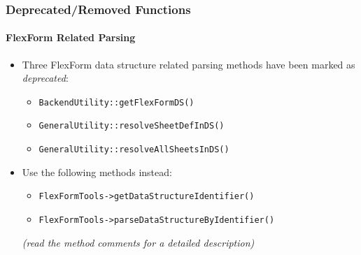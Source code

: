 \begin{frame}[fragile]
	\frametitle{Deprecated/Removed Functions}
	\framesubtitle{FlexForm Related Parsing}

	\begin{itemize}
		\item Three FlexForm data structure related parsing methods have been marked as \textit{deprecated}:

			\begin{itemize}
				\item \texttt{BackendUtility::getFlexFormDS()}
				\item \texttt{GeneralUtility::resolveSheetDefInDS()}
				\item \texttt{GeneralUtility::resolveAllSheetsInDS()}
			\end{itemize}

		\item Use the following methods instead:

			\begin{itemize}
				\item \texttt{FlexFormTools->getDataStructureIdentifier()}
				\item \texttt{FlexFormTools->parseDataStructureByIdentifier()}
			\end{itemize}

		\small
			\textit{(read the method comments for a detailed description)}
		\normalsize

	\end{itemize}

\end{frame}







